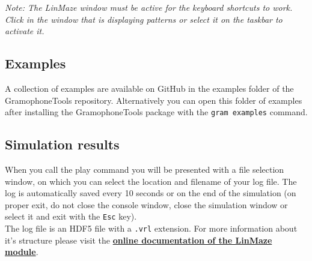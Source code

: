 \documentclass[11pt,a4paper]{article}
\newcommand{\param}[1]{\item \texttt{#1} -}
\newcommand{\note}[1]{\textit{Note: {#1}}}
\begin{document}
\note{The LinMaze window must be active for the keyboard shortcuts to work. Click in the window that is displaying patterns or select it on the taskbar to activate it.}


\subsection{Examples}
A collection of examples are available on GitHub in the examples folder of the GramophoneTools repository. Alternatively you can open this folder of examples after installing the GramophoneTools package with the \texttt{gram examples} command.

\subsection{Simulation results}
When you call the play command you will be presented with a file selection window, on which you can select the location and filename of your log file. The log is automatically saved every 10 seconds or on the end of the simulation (on proper exit, do not close the console window, close the simulation window or select it and exit with the \texttt{Esc} key).\\

The log file is an HDF5 file with a \texttt{.vrl} extension. For more information about it's structure please visit the \href{http://gramophone.femtonics.eu/linmaze_out.html}{\textbf{online documentation of the LinMaze module}}.

\end{document}
